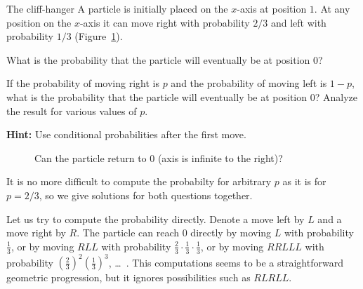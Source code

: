 
\begin{prob}{The cliff-hanger}
A particle is initially placed on the $x$-axis at position $1$. At any position on the $x$-axis it can move right with probability $2/3$ and left with probability $1/3$ (Figure~\ref{f.ruin1}).

 What is the probability that the particle will eventually be at position $0$?

 If the probability of moving right is $p$ and the probability of moving left is $1-p$, what is the probability that the particle will eventually be at position $0$? Analyze the result for various values of $p$.

\textbf{Hint:} Use conditional probabilities after the first move.
\begin{figure}[tb]
\begin{center}
\end{center}
\caption{Can the particle return to $0$ (axis is infinite to the right)?}\label{f.ruin1}
\end{figure}
\end{prob}

\solution{}

It is no more difficult to compute the probabilty for arbitrary $p$ as it is for $p=2/3$, so we give solutions for both questions together.

Let us try to compute the probability directly. Denote a move left by $L$ and a move right by $R$. The particle can reach $0$ directly by moving $L$ with probability $\frac{1}{3}$, or by moving $RLL$ with probability $\frac{2}{3}\cdot\frac{1}{3}\cdot\frac{1}{3}$, or by moving $RRLLL$ with probability $\left(\frac{2}{3}\right)^2\left(\frac{1}{3}\right)^3$, \ldots\ . This computations seems to be a straightforward geometric progression, but it ignores possibilities such as $RLRLL$.

